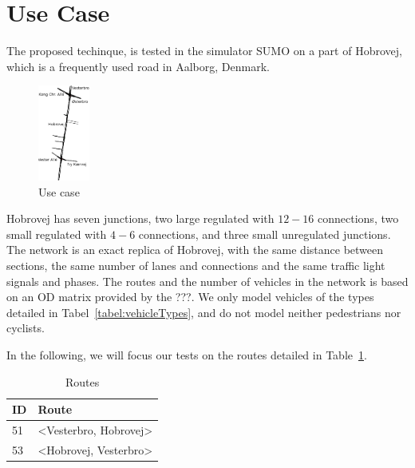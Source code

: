 \section{Use Case}
The proposed techinque, \tech is tested in the simulator SUMO on a part of Hobrovej, which is a frequently used road in Aalborg, Denmark.

\begin{figure}[htb]
\centering
\includegraphics[width=0.15\textwidth]{images/Hobrovej.png}
\caption{Use case}
\label{fig:Introduction:hobro}
\end{figure}

Hobrovej has seven junctions, two large regulated with $12-16$ connections, two small regulated with $4-6$ connections, and three small unregulated junctions.
The network is an exact replica of Hobrovej, with the same distance between sections, the same number of lanes and connections and the same traffic light signals and phases.
The routes and the number of vehicles in the network is based on an OD matrix provided by the ???.
We only model vehicles of the types detailed in Tabel~\ref{tabel:vehicleTypes}, and do not model neither pedestrians nor cyclists.

In the following, we will focus our tests on the routes detailed in Table~\ref{tb:useCase:routes}.
\begin{table} %
\centering
\begin{tabular}{|l|l|}\hline
\textbf{ID} & \textbf{Route}\\\hline
51 & <Vesterbro, Hobrovej>\\\hline
53 & <Hobrovej, Vesterbro>\\\hline
\end{tabular}
\caption{Routes}\label{tb:useCase:routes}
\end{table}
